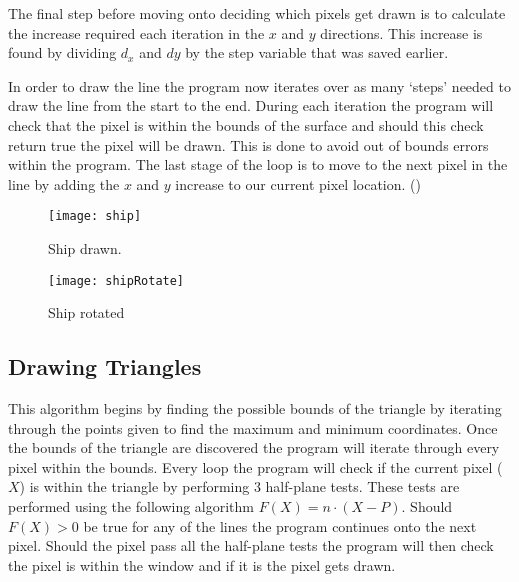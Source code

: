 \documentclass[
	a4paper, %
	10pt, %
]{CSUniSchoolLabReport}
\begin{document}
\begin{flushleft}
	The final step before moving onto deciding which pixels get drawn is to calculate
	the increase required each iteration in the \(x\) and \(y\) directions.
	This increase is found by dividing \(d_x\) and \(dy\) by the step variable that was
	saved earlier. 
\end{flushleft}

\begin{flushleft}
	In order to draw the line the program now iterates over as many `steps'
	needed to draw the line from the start to the end. During each iteration
	the program will check that the pixel is within the bounds of the surface
	and should this check return true the pixel will be drawn. This is done to 
	avoid out of bounds errors within the program. The last stage of the loop is 
	to move to the next pixel in the line by adding the \(x\) and \(y\) increase 
	to our current pixel location. (\cite{Kamble:2021})
\end{flushleft}



\begin{figure}[H]
	\centering
	\begin{minipage}[b]{0.4\textwidth}
		\texttt{[image: ship]}
		\caption{Ship drawn.}
	\end{minipage}
	\hfill
	\begin{minipage}[b]{0.4\textwidth}
		\texttt{[image: shipRotate]}
		\caption{Ship rotated}
  	\end{minipage}
\end{figure}

\subsection{Drawing Triangles}
\begin{flushleft}
	This algorithm begins by finding the possible bounds of the triangle by 
	iterating through the points given to find the maximum and minimum coordinates. 
	Once the bounds of the triangle are discovered the program will iterate 
	through every pixel within the bounds. Every loop the program will check 
	if the current pixel (\(X\)) is within the triangle by performing 3 half-plane tests.
	These tests are performed using the following algorithm \(F(X)=n \cdot (X - P)\).
	Should \(F(X) > 0\) be true for any of the lines the program continues onto 
	the next pixel. Should the pixel pass all the half-plane tests the program will 
	then check the pixel is within the window and if it is the pixel gets drawn. 

\end{flushleft}
\end{document}
